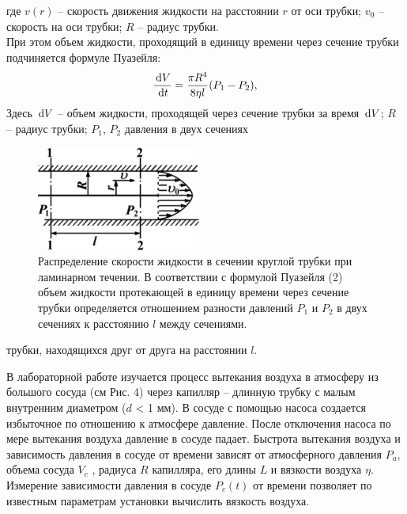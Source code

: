 \documentclass[a4paper]{article}
\begin{document}
где $v(r)$ – скорость движения жидкости на расстоянии $r$ от оси
трубки; $v_0$ – скорость на оси трубки; $R$ – радиус трубки.\\
При этом объем жидкости, проходящий в единицу времени
через сечение трубки подчиняется формуле Пуазейля:
\begin{equation}
    \dfrac{\dl V}{\dl t} = \dfrac{\pi R^4}{8 \eta l }(P_1 - P_2),
\end{equation}
Здесь $\dl V$ – объем жидкости, проходящей через сечение трубки
за время $\dl V$; $R$ – радиус трубки; $P_1$, $P_2$ давления в двух сечениях
\begin{figure}[H]
    \begin{center}
    \includegraphics[width=0.48\textwidth]{pick_2}
    \caption{Распределение скорости жидкости в сечении круглой трубки
при ламинарном течении. В соответствии с формулой Пуазейля (2)
объем жидкости протекающей в единицу времени через сечение
трубки определяется отношением разности давлений $P_1$ и $P_2$ в двух
сечениях к расстоянию $l$ между сечениями.}
\end{center}
\end{figure}

трубки, находящихся друг от друга на расстоянии $l$.

В лабораторной работе изучается процесс вытекания воздуха
в атмосферу из большого сосуда (см Рис. 4) через капилляр –
длинную трубку с малым внутренним диаметром ($d$ < 1 мм). В
сосуде с помощью насоса создается избыточное по отношению
к атмосфере давление. После отключения насоса по мере вытекания воздуха давление в сосуде падает. Быстрота вытекания
воздуха и зависимость давления в сосуде от времени зависят от
атмосферного давления $P_a$, объема сосуда $V_c$ , радиуса $R$ капилляра, его длины $L$ и вязкости воздуха $\eta$. Измерение зависимости
давления в сосуде $P_c(t)$ от времени позволяет по известным параметрам установки вычислить вязкость воздуха.\\
\end{document}
